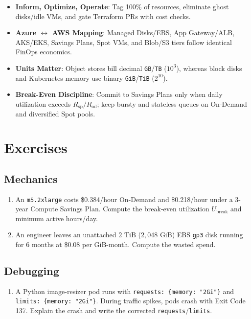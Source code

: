 \begin{itemize}[leftmargin=18pt]
  \item \textbf{Inform, Optimize, Operate}: Tag 100\% of resources, eliminate ghost disks/idle VMs, and gate Terraform PRs with cost checks.
  \item \textbf{Azure $\leftrightarrow$ AWS Mapping}: Managed Disks/EBS, App Gateway/ALB, AKS/EKS, Savings Plans, Spot VMs, and Blob/S3 tiers follow identical FinOps economics.
  \item \textbf{Units Matter}: Object stores bill decimal \texttt{GB}/\texttt{TB} ($10^3$), whereas block disks and Kubernetes memory use binary \texttt{GiB}/\texttt{TiB} ($2^{10}$).
  \item \textbf{Break-Even Discipline}: Commit to Savings Plans only when daily utilization exceeds $R_{\text{sp}}/R_{\text{od}}$; keep bursty and stateless queues on On-Demand and diversified Spot pools.
\end{itemize}

\section{Exercises}

\subsection*{Mechanics}
\begin{enumerate}[label=\textbf{Exercise~\thechapter.\arabic*}, leftmargin=*]
  \item An \texttt{m5.2xlarge} costs \$0.384/hour On-Demand and \$0.218/hour under a 3-year Compute Savings Plan. Compute the break-even utilization $U_{\text{break}}$ and minimum active hours/day.
  \item An engineer leaves an unattached $2\text{ TiB}$ ($2,048\text{ GiB}$) EBS \texttt{gp3} disk running for 6 months at \$0.08 per GiB-month. Compute the wasted spend.
\end{enumerate}

\subsection*{Debugging}
\begin{enumerate}[label=\textbf{Exercise~\thechapter.\arabic*}, leftmargin=*, start=3]
  \item A Python image-resizer pod runs with \texttt{requests: \{memory: "2Gi"\}} and \texttt{limits: \{memory: "2Gi"\}}. During traffic spikes, pods crash with Exit Code 137. Explain the crash and write the corrected \texttt{requests}/\texttt{limits}.
\end{enumerate}

